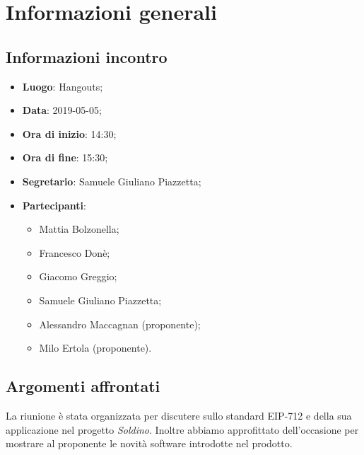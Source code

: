\section{Informazioni generali}

\subsection{Informazioni incontro}
\begin{itemize}
\item \textbf{Luogo}: Hangouts;
\item \textbf{Data}: 2019-05-05;
\item \textbf{Ora di inizio}: 14:30;
\item \textbf{Ora di fine}: 15:30;
\item \textbf{Segretario}: Samuele Giuliano Piazzetta;
\item \textbf{Partecipanti}: 
\begin{itemize}
	\item Mattia Bolzonella;
	\item Francesco Donè;
	\item Giacomo Greggio;
	\item Samuele Giuliano Piazzetta;
	\item Alessandro Maccagnan (proponente);
	\item Milo Ertola (proponente).
\end{itemize}
\end{itemize}

\subsection{Argomenti affrontati}
La riunione è stata organizzata per discutere sullo standard EIP-712 e della sua applicazione nel progetto \textit{Soldino}. Inoltre abbiamo approfittato dell'occasione per mostrare al proponente le novità software introdotte nel prodotto.
